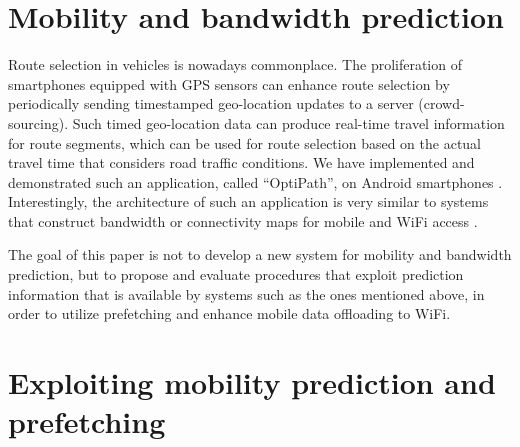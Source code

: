 \documentclass{sig-alternate}
\newcommand{\mynotex}[1]{}
\begin{document}
\mynotex{Additional notes:
\begin{itemize}
\item In this paper we investigate prediction in the time-domain, namely a nodes location in some future time. We can also exploit mobility prediction in the space-domain, i.e. to consider multiple future network attachment point where a node can move to, and prefetch data not in one location but in multiple possible future locations.
\end{itemize}


}


\section{Mobility and bandwidth prediction}
\label{sec:route}

Route selection in vehicles is nowadays commonplace.
The proliferation of smartphones equipped with GPS sensors can enhance route selection by periodically sending timestamped geo-location updates to a server (crowd-sourcing). Such timed geo-location data can produce  real-time  travel information for  route segments, which can be used for route selection based on the actual travel time that considers road traffic conditions.
We have implemented and demonstrated such an application, called ``OptiPath'', on Android smartphones \cite{Kal++12}.
Interestingly, the architecture of such an application is very similar to systems that construct bandwidth or connectivity maps for mobile and WiFi access \cite{Nic++08,Yao++09,Pan++09}.

The goal of this paper is not to develop a new system for mobility and bandwidth prediction, but to propose and evaluate procedures that exploit prediction information that is available by systems such as the ones mentioned above, in order to utilize prefetching  and enhance mobile data offloading to WiFi.

\mynotex{ This section should contain:
\begin{itemize}
\item utilization of crowdsourcing
\item note arch is the same
\item text on what additional information is necessary: location of WiFi hotspots, range, throughput, etc.
\end{itemize}
}




\section{Exploiting mobility prediction and prefetching}
\label{sec:procedures}
\end{document}
